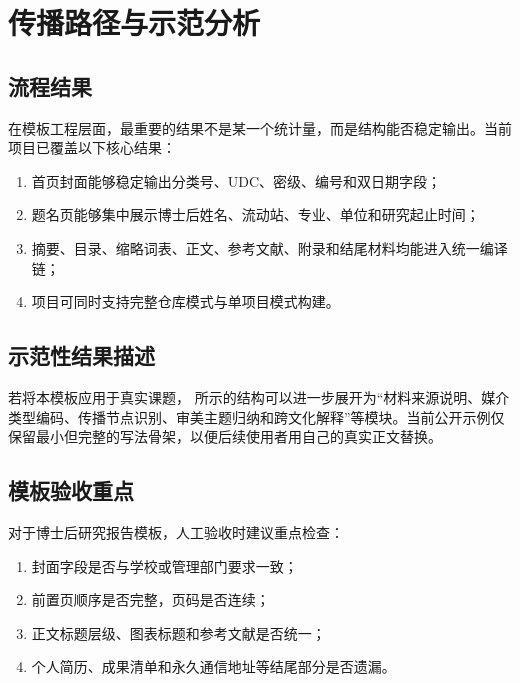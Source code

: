 \chapter{传播路径与示范分析}

\section{流程结果}

在模板工程层面，最重要的结果不是某一个统计量，而是结构能否稳定输出。当前项目已覆盖以下核心结果：

\begin{enumerate}
  \item 首页封面能够稳定输出分类号、UDC、密级、编号和双日期字段；
  \item 题名页能够集中展示博士后姓名、流动站、专业、单位和研究起止时间；
  \item 摘要、目录、缩略词表、正文、参考文献、附录和结尾材料均能进入统一编译链；
  \item 项目可同时支持完整仓库模式与单项目模式构建。
\end{enumerate}

\section{示范性结果描述}

若将本模板应用于真实课题， 所示的结构可以进一步展开为“材料来源说明、媒介类型编码、传播节点识别、审美主题归纳和跨文化解释”等模块。当前公开示例仅保留最小但完整的写法骨架，以便后续使用者用自己的真实正文替换。

\section{模板验收重点}

对于博士后研究报告模板，人工验收时建议重点检查：

\begin{enumerate}
  \item 封面字段是否与学校或管理部门要求一致；
  \item 前置页顺序是否完整，页码是否连续；
  \item 正文标题层级、图表标题和参考文献是否统一；
  \item 个人简历、成果清单和永久通信地址等结尾部分是否遗漏。
\end{enumerate}
